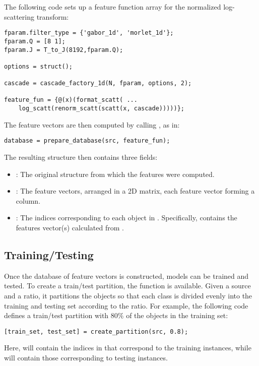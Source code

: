 \documentclass[twocolumn]{article}
\begin{document}
The following code sets up a feature function array for the normalized log-scattering transform:
\begin{lstlisting}
fparam.filter_type = {'gabor_1d', 'morlet_1d'};
fparam.Q = [8 1];
fparam.J = T_to_J(8192,fparam.Q);

options = struct();

cascade = cascade_factory_1d(N, fparam, options, 2);

feature_fun = {@(x)(format_scatt( ...
	log_scatt(renorm_scatt(scatt(x, cascade)))))};
\end{lstlisting}

The feature vectors are then computed by calling , as in:
\begin{lstlisting}
database = prepare_database(src, feature_fun);
\end{lstlisting}
The resulting  structure then contains three fields:
\begin{itemize}
	\item {}: The original  structure from which the features were computed.
	\item {}: The feature vectors, arranged in a 2D matrix, each feature vector forming a column.
	\item {}: The indices corresponding to each object in . Specifically,  contains the features vector(s) calculated from .
\end{itemize}

\subsection{Training/Testing}

Once the database of feature vectors is constructed, models can be trained and tested. To create a train/test partition, the function  is available. Given a source  and a ratio, it partitions the objects so that each class is divided evenly into the training and testing set according to the ratio. For example, the following code defines a train/test partition with $80\%$ of the objects in the training set:
\begin{lstlisting}
[train_set, test_set] = create_partition(src, 0.8);
\end{lstlisting}
Here,  will contain the indices in  that correspond to the training instances, while  will contain those corresponding to testing instances.
\end{document}
